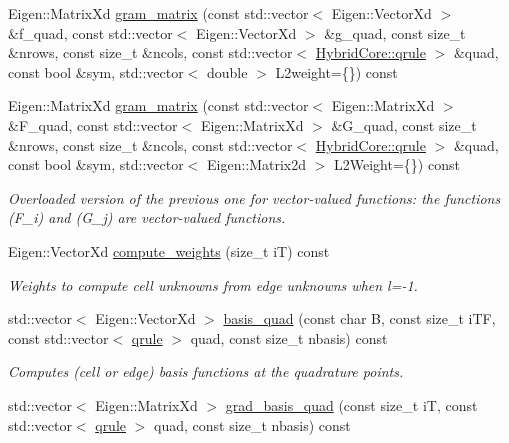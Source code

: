 \begin{DoxyCompactItemize}
Eigen\+::\+Matrix\+Xd \hyperlink{classHArDCore2D_1_1HybridCore_a1b9e2d375b5a3a578b79fb2cc0100b6b}{gram\+\_\+matrix} (const std\+::vector$<$ Eigen\+::\+Vector\+Xd $>$ \&f\+\_\+quad, const std\+::vector$<$ Eigen\+::\+Vector\+Xd $>$ \&g\+\_\+quad, const size\+\_\+t \&nrows, const size\+\_\+t \&ncols, const std\+::vector$<$ \hyperlink{structHArDCore2D_1_1HybridCore_1_1qrule}{Hybrid\+Core\+::qrule} $>$ \&quad, const bool \&sym, std\+::vector$<$ double $>$ L2weight=\{\}) const
\item 
Eigen\+::\+Matrix\+Xd \hyperlink{classHArDCore2D_1_1HybridCore_a2a161a38925425d27eeea8eee890e05b}{gram\+\_\+matrix} (const std\+::vector$<$ Eigen\+::\+Matrix\+Xd $>$ \&F\+\_\+quad, const std\+::vector$<$ Eigen\+::\+Matrix\+Xd $>$ \&G\+\_\+quad, const size\+\_\+t \&nrows, const size\+\_\+t \&ncols, const std\+::vector$<$ \hyperlink{structHArDCore2D_1_1HybridCore_1_1qrule}{Hybrid\+Core\+::qrule} $>$ \&quad, const bool \&sym, std\+::vector$<$ Eigen\+::\+Matrix2d $>$ L2\+Weight=\{\}) const
\begin{DoxyCompactList}\small\item\em Overloaded version of the previous one for vector-\/valued functions\+: the functions (F\+\_\+i) and (G\+\_\+j) are vector-\/valued functions. \end{DoxyCompactList}\item 
\mbox{\label{classHArDCore2D_1_1HybridCore_a06825c5d156026d465a2798389aa952b}} 
Eigen\+::\+Vector\+Xd \hyperlink{classHArDCore2D_1_1HybridCore_a06825c5d156026d465a2798389aa952b}{compute\+\_\+weights} (size\+\_\+t iT) const
\begin{DoxyCompactList}\small\item\em Weights to compute cell unknowns from edge unknowns when l=-\/1. \end{DoxyCompactList}\item 
std\+::vector$<$ Eigen\+::\+Vector\+Xd $>$ \hyperlink{classHArDCore2D_1_1HybridCore_adc7afe2ff1f5a56ebe48b407bdf08d6e}{basis\+\_\+quad} (const char B, const size\+\_\+t i\+TF, const std\+::vector$<$ \hyperlink{structHArDCore2D_1_1HybridCore_1_1qrule}{qrule} $>$ quad, const size\+\_\+t nbasis) const
\begin{DoxyCompactList}\small\item\em Computes (cell or edge) basis functions at the quadrature points. \end{DoxyCompactList}\item 
std\+::vector$<$ Eigen\+::\+Matrix\+Xd $>$ \hyperlink{classHArDCore2D_1_1HybridCore_a14adb4f4cfdd2dc7f9be9bfd085e7d87}{grad\+\_\+basis\+\_\+quad} (const size\+\_\+t iT, const std\+::vector$<$ \hyperlink{structHArDCore2D_1_1HybridCore_1_1qrule}{qrule} $>$ quad, const size\+\_\+t nbasis) const

\end{DoxyCompactItemize}
